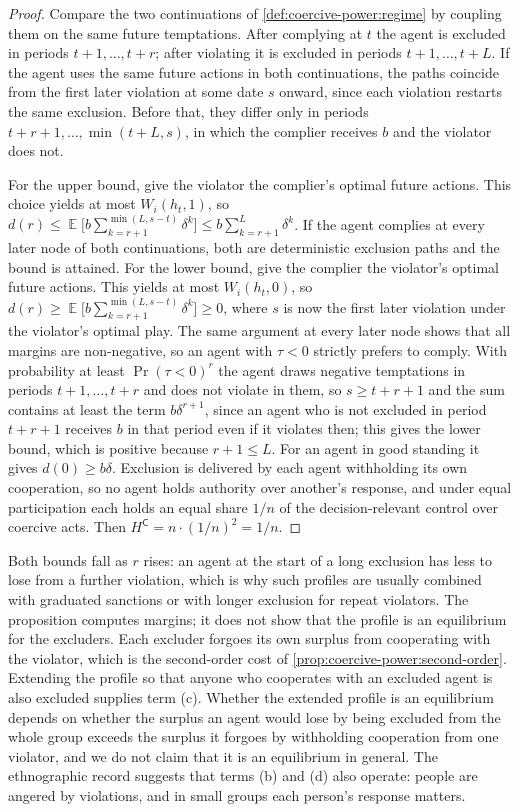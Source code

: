 \documentclass[11pt,letterpaper]{article}
\theoremstyle{definition}
\theoremstyle{remark}
\newcommand{\pC}{\mathsf{C}}
\newcommand{\E}{\operatorname{\mathbb{E}}}
\renewcommand{\Pr}{\operatorname{Pr}}
\begin{document}
\begin{proof}
Compare the two continuations of \cref{def:coercive-power:regime} by coupling them on the same future temptations. After complying at $t$ the agent is excluded in periods $t+1, \dots, t+r$; after violating it is excluded in periods $t+1, \dots, t+L$. If the agent uses the same future actions in both continuations, the paths coincide from the first later violation at some date $s$ onward, since each violation restarts the same exclusion. Before that, they differ only in periods $t+r+1, \dots, \min(t+L, s)$, in which the complier receives $b$ and the violator does not.

For the upper bound, give the violator the complier's optimal future actions. This choice yields at most $W_i(h_t,1)$, so $d(r) \le \E\bigl[b\sum_{k=r+1}^{\min(L, s-t)}\delta^k\bigr] \le b\sum_{k=r+1}^{L}\delta^k$. If the agent complies at every later node of both continuations, both are deterministic exclusion paths and the bound is attained. For the lower bound, give the complier the violator's optimal future actions. This yields at most $W_i(h_t,0)$, so $d(r) \ge \E\bigl[b\sum_{k=r+1}^{\min(L, s-t)}\delta^k\bigr] \ge 0$, where $s$ is now the first later violation under the violator's optimal play. The same argument at every later node shows that all margins are non-negative, so an agent with $\tau < 0$ strictly prefers to comply. With probability at least $\Pr(\tau<0)^{r}$ the agent draws negative temptations in periods $t+1, \dots, t+r$ and does not violate in them, so $s \ge t+r+1$ and the sum contains at least the term $b\delta^{r+1}$, since an agent who is not excluded in period $t+r+1$ receives $b$ in that period even if it violates then; this gives the lower bound, which is positive because $r + 1 \le L$. For an agent in good standing it gives $d(0) \ge b\delta$. Exclusion is delivered by each agent withholding its own cooperation, so no agent holds authority over another's response, and under equal participation each holds an equal share $1/n$ of the decision-relevant control over coercive acts. Then $H^{\pC} = n \cdot (1/n)^2 = 1/n$.
\end{proof}

Both bounds fall as $r$ rises: an agent at the start of a long exclusion has less to lose from a further violation, which is why such profiles are usually combined with graduated sanctions or with longer exclusion for repeat violators. The proposition computes margins; it does not show that the profile is an equilibrium for the excluders. Each excluder forgoes its own surplus from cooperating with the violator, which is the second-order cost of \cref{prop:coercive-power:second-order}. Extending the profile so that anyone who cooperates with an excluded agent is also excluded supplies term (c). Whether the extended profile is an equilibrium depends on whether the surplus an agent would lose by being excluded from the whole group exceeds the surplus it forgoes by withholding cooperation from one violator, and we do not claim that it is an equilibrium in general. The ethnographic record suggests that terms (b) and (d) also operate: people are angered by violations, and in small groups each person's response matters.
\end{document}
